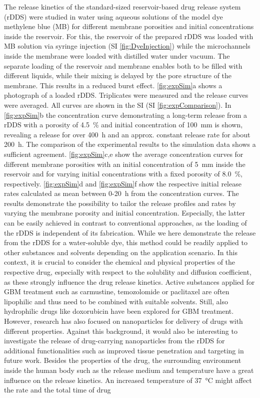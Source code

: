 The release kinetics of the standard-sized reservoir-based drug release system (rDDS) were studied in water using aqueous solutions of the model dye methylene blue (MB) for different membrane porosities and initial concentrations inside the reservoir. For this, the reservoir of the prepared rDDS was loaded with MB solution via syringe injection (SI \cref{fig:DyeInjection}) while the microchannels inside the membrane were loaded with distilled water under vacuum. The separate loading of the reservoir and membrane enables both to be filled with different liquids, while their mixing is delayed by the pore structure of the membrane. This results in a reduced burst effect. \cref{fig:expSim}a shows a photograph of a loaded rDDS. Triplicates were measured and the release curves were averaged. All curves are shown in the SI (SI \cref{fig:expComparison}). In \cref{fig:expSim}b the concentration curve demonstrating a long-term release from a rDDS with a porosity of 4.5~\% and initial concentration of 100~mm is shown, revealing a release for over 400~h and an approx. constant release rate for about 200~h. The comparison of the experimental results to the simulation data shows a sufficient agreement. \cref{fig:expSim}c,e show the average concentration curves for different membrane porosities with an initial concentration of 5~mm inside the reservoir and for varying initial concentrations with a fixed porosity of 8.0~\%, respectively. \cref{fig:expSim}d and \cref{fig:expSim}f show the respective initial release rates calculated as mean between 0-20~h from the concentration curves. The results demonstrate the possibility to tailor the release profiles and rates by varying the membrane porosity and initial concentration. Especially, the latter can be easily achieved in contrast to conventional approaches, as the loading of the rDDS is independent of its fabrication. While we here demonstrate the release from the rDDS for a water-soluble dye, this method could be readily applied to other substances and solvents depending on the application scenario. In this context, it is crucial to consider the chemical and physical properties of the respective drug, especially with respect to the solubility and diffusion coefficient, as these strongly influence the drug release kinetics. Active substances applied for GBM treatment such as carmustine\supercite{lin2008carmustine}, temozolomide\supercite{fisher2021current} or paclitaxel\supercite{zhao2019codelivery} are often lipophilic and thus need to be combined with suitable solvents. Still, also hydrophilic drugs like doxorubicin have been explored for GBM treatment\supercite{malfanti2022design}. However, research has also focused on nanoparticles for delivery of drugs with different properties\supercite{mitchell2021engineering}. Against this background, it would also be interesting to investigate the release of drug-carrying nanoparticles from the rDDS for additional functionalities such as improved tissue penetration and targeting\supercite{gazaille2021local,nance2014brain} in future work. Besides the properties of the drug, the surrounding environment inside the human body such as the release medium and temperature have a great influence on the release kinetics. An increased temperature of 37~°C might affect the rate and the total time of drug 